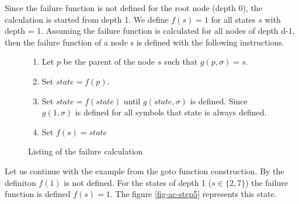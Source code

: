 \documentclass[english,twoside,censored,csm,algorithms-track-2020]{HYthesisML}
\theoremstyle{plain}
\theoremstyle{definition}
\begin{document}
  Since the failure function is not defined for the root node (depth 0), the calculation is started from
  depth 1. We define $f(s)=1$ for all states $s$ with depth = 1. Assuming the failure function is
  calculated for all nodes of depth d-1, then the failure function of a node s is defined with the
  following instructions.
  
  \begin{figure}[h]
  \begin{enumerate}
  \item Let $p$ be the parent of the node $s$ such that $g(p,\sigma) = s$.
  \item Set $state = f(p)$.
  \item Set $state = f(state)$ until $g(state,\sigma)$ is defined. Since $g(1,\sigma)$ is defined
    for all symbols that state is always defined.
  \item Set $f(s) = state$
  \end{enumerate}
   \caption{Listing of the failure calculation} \label{failure-calculation}    
  \end{figure}

  Let us continue with the example from the goto function construction. By the definiton $f(1)$ is not
  defined. For the states of depth 1 ($s\in\{2,7\}$) the failure function is defined $f(s)=1$. The
  figure \ref{fig-ac-step5} represents this state.
\end{document}
